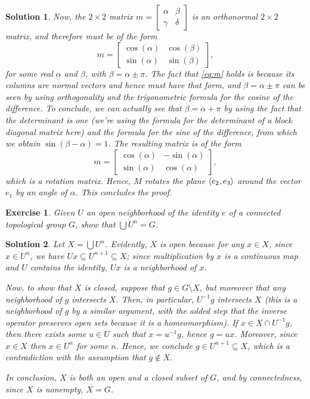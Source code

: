 \documentclass{article}
\newtheorem{ex}{Exercise}
\theoremstyle{nonumberplain}
\newtheorem{sol}{Solution}
\DeclarePairedDelimiter{\braket}{\langle}{\rangle}
\begin{document}
\begin{sol}
Now, the $2 \times 2$ matrix $m = \left[\begin{smallmatrix} \alpha & \beta \\ \gamma & \delta \end{smallmatrix}\right]$ is an orthonormal $2 \times 2$ matrix, and therefore must be of the form
\begin{equation}\label{eq:m}
m = 
\begin{bmatrix}
\cos(\alpha) & \cos(\beta) \\
\sin(\alpha) & \sin(\beta)
\end{bmatrix},
\end{equation}
for some real $\alpha$ and $\beta$, with $\beta = \alpha \pm \pi$. The fact that \eqref{eq:m} holds is because its columns are normal vectors and hence must have that form, and $\beta = \alpha \pm \pi$ can be seen by using orthogonality and the trigonometric formula for the cosine of the difference. To conclude, we can actually see that $\beta = \alpha + \pi$ by using the fact that the determinant is one (we're using the formula for the determinant of a block diagonal matrix here) and the formula for the sine of the difference, from which we obtain $\sin(\beta - \alpha) = 1$. The resulting matrix is of the form
\begin{equation}
m = 
\begin{bmatrix}
\cos(\alpha) & -\sin(\alpha) \\
\sin(\alpha) & \cos(\alpha)
\end{bmatrix},
\end{equation}
which is a rotation matrix. Hence, $M$ rotates the plane $\braket{e_2, e_3}$ around the vector $e_1$ by an angle of $\alpha$. This concludes the proof.
\end{sol}

\begin{ex}
Given $U$ an open neighborhood of the identity $e$ of a connected topological group $G$, show that $\bigcup U^n = G$.
\end{ex}

\begin{sol}
Let $X = \bigcup U^n$. Evidently, $X$ is open because for any $x \in X$, since $x \in U^n$, we have $Ux \subseteq U^{n+1} \subseteq X$; since multiplication by $x$ is a continuous map and $U$ contains the identity, $Ux$ is a neighborhood of $x$.

Now, to show that $X$ is closed, suppose that $g \in G \setminus X$, but moreover that any neighborhood of $g$ intersects $X$. Then, in particular, $U^{-1} g$ intersects $X$ (this is a neighborhood of $g$ by a similar argument, with the added step that the inverse operator preserves open sets because it is a homeomorphism). If $x \in X \cap U^{-1} g$, then there exists some $u \in U$ such that $x = u^{-1} g$, hence $g = u x$. Moreover, since $x \in X$ then $x \in U^n$ for some $n$. Hence, we conclude $g \in U^{n+1} \subseteq X$, which is a contradiction with the assumption that $g \not \in X$.

In conclusion, $X$ is both an open and a closed subset of $G$, and by connectedness, since $X$ is nonempty, $X = G$.
\end{sol}
\end{document}
